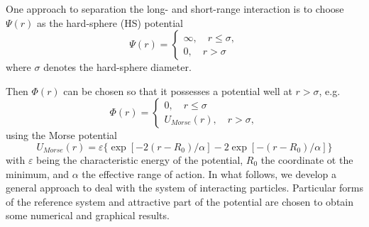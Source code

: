 One approach to separation the long- and short-range interaction is to choose $\Psi(r)$ as the hard-sphere (HS) potential
\begin{equation}
	\Psi(r) = 
	\left\{
	\begin{array}{cc}
		\infty, \quad r\leq \sigma, \\
		0, \quad r > \sigma
	\end{array}
	\right.
\end{equation}
where $\sigma$ denotes the hard-sphere diameter.

Then $\Phi(r)$ can be chosen so that it possesses a potential well at $r > \sigma$, e.g.
\begin{equation}
	\label{short-range-potential}
	\Phi(r) = \left\{
	\begin{array}{cc}
		0, \quad r \leq \sigma \\
		U_{Morse}(r), \quad r > \sigma,
	\end{array}
	\right.
\end{equation}
using the Morse potential
\begin{equation}
	U_{Morse}(r) = \varepsilon \{\exp{[-2(r-R_0)/\alpha]}-2\exp{[-(r-R_0)/\alpha]}\}
\end{equation}
with $\varepsilon$ being the characteristic energy of the potential, $R_0$ the coordinate ot the minimum, and $\alpha$ the effective range of action.
In what follows, we develop a general approach to deal with the system of interacting particles. Particular forms of the reference system and attractive part of the potential are chosen to obtain some numerical and graphical results.

